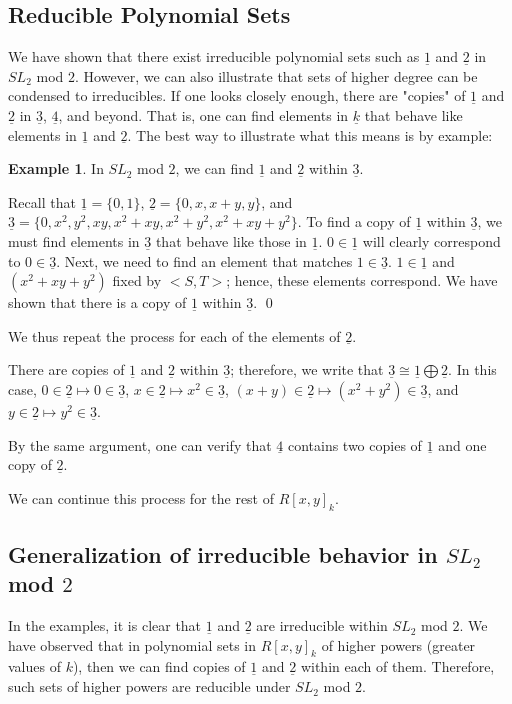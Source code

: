 \documentclass[a4paper,draft]{amsproc}
\theoremstyle{plain}
\theoremstyle{definition}
\newtheorem{exm}{Example}[section]
\theoremstyle{remark}
\numberwithin{equation}{section}
\begin{document}
\subsection{Reducible Polynomial Sets}
We have shown that there exist irreducible polynomial sets such as $\underline{1}$ and $\underline{2}$ in  $SL_{2}$ mod $2$. However, we can also illustrate that sets of higher degree can be condensed to irreducibles. If one looks closely enough, there are "copies" of $\underline{1}$ and $\underline{2}$ in $\underline{3}$, $\underline{4}$, and beyond. That is, one can find elements in $\underline{k}$ that behave like elements in $\underline{1}$ and $\underline{2}$. The best way to illustrate what this means is by example: 
\begin{exm}

In  $SL_{2}$ mod $2$, we can find $\underline{1}$ and $\underline{2}$ within $\underline{3}$. 

Recall that $\underline{1} = \{0, 1\}$, $\underline{2} = \{0, x, x + y, y\}$, and $\underline{3} = \{0, x^{2}, y^{2}, xy, x^{2} + xy, x^{2} + y^{2}, x^{2} + xy + y^{2}\}$. To find a copy of $\underline{1}$ within $\underline{3}$, we must find elements in $\underline{3}$ that behave like those in $\underline{1}$. $0 \in \underline{1}$ will clearly correspond to $0 \in \underline{3}$. Next, we need to find an element that matches $1 \in \underline{3}$. $1 \in \underline{1}$ and $(x^{2} + xy + y^{2})$ fixed by $<S, T>$; hence, these elements correspond. We have shown that there is a copy of $\underline{1}$ within $\underline{3}$. \qed

We thus repeat the process for each of the elements of $\underline{2}$. 

There are copies of $\underline{1}$ and $\underline{2}$ within $\underline{3}$; therefore, we write that $\underline{3} \cong \underline{1} \bigoplus \underline{2}$. In this case, $0 \in \underline{2} \mapsto 0 \in \underline{3}$, $x \in \underline{2} \mapsto x^{2} \in \underline{3}$, $(x + y) \in \underline{2} \mapsto (x^{2} + y^{2}) \in \underline{3}$, and $y \in \underline{2} \mapsto y^{2} \in \underline{3}$. 
\end{exm}

By the same argument, one can verify that $\underline{4}$ contains two copies of $\underline{1}$ and one copy of $\underline{2}$. 

We can continue this process for the rest of $R[x,y]_{k}$. 

\subsection{Generalization of irreducible behavior in $SL_{2}$ mod $2$}
In the examples, it is clear that $\underline{1}$ and $\underline{2}$ are irreducible within $SL_{2}$ mod $2$. We have observed that in polynomial sets in $R[x,y]_{k}$  of higher powers (greater values of $k$), then we can find copies of $\underline{1}$ and $\underline{2}$ within each of them. Therefore, such sets of higher powers are reducible under $SL_{2}$ mod $2$. 
\end{document}
